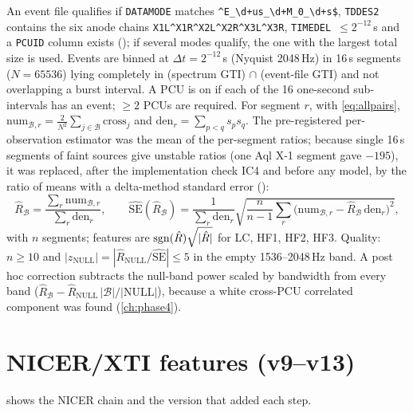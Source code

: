 An event file qualifies if \texttt{DATAMODE} matches \texttt{\^{}E\_\textbackslash d+us\_\textbackslash d+M\_0\_\textbackslash d+s\$},
\texttt{TDDES2} contains the six anode chains \texttt{X1L\^{}X1R\^{}X2L\^{}X2R\^{}X3L\^{}X3R}, \texttt{TIMEDEL}~$\le2^{-12}$\,s and a
\texttt{PCUID} column exists (); if several modes qualify, the one with the largest total size
is used. Events are binned at $\Delta t=2^{-12}$\,s (Nyquist 2048\,Hz) in 16\,s segments ($N=65536$) lying completely in
(spectrum GTI) $\cap$ (event-file GTI) and not overlapping a burst interval. A PCU is on if each of the 16 one-second
sub-intervals has an event; $\ge2$ PCUs are required. For segment $r$, with \cref{eq:allpairs},
$\mathrm{num}_{\mathcal B,r} = \frac{2}{N^2}\sum_{j\in\mathcal B}\mathrm{cross}_j$ and
$\mathrm{den}_r=\sum_{p<q}s_ps_q$. The pre-registered per-observation estimator was the mean of the per-segment ratios;
because single 16\,s segments of faint sources give unstable ratios (one Aql X-1 segment gave $-195$), it was replaced,
after the implementation check IC4 and before any model, by the ratio of means with a delta-method standard error
():
\begin{equation}
\hat R_\mathcal{B} = \frac{\sum_r \mathrm{num}_{\mathcal B,r}}{\sum_r \mathrm{den}_r},\qquad
\widehat{\mathrm{SE}}(\hat R_\mathcal{B}) = \frac{1}{\sum_r\mathrm{den}_r}\sqrt{\frac{n}{n-1}\sum_r\bigl(\mathrm{num}_{\mathcal B,r}-\hat R_\mathcal{B}\,\mathrm{den}_r\bigr)^2},\label{eq:ratioofmeans}
\end{equation}
with $n$ segments; features are $\operatorname{sgn}(\hat R)\sqrt{|\hat R|}$ for LC, HF1, HF2, HF3. Quality: $n\ge10$ and
$|z_\mathrm{NULL}|=|\hat R_\mathrm{NULL}/\widehat{\mathrm{SE}}|\le5$ in the empty 1536--2048\,Hz band. A post hoc
correction subtracts the null-band power scaled by bandwidth from every band
($\hat R_\mathcal{B}-\hat R_\mathrm{NULL}\,|\mathcal B|/|\mathrm{NULL}|$), because a white cross-PCU correlated component
was found (\cref{ch:phase4}).

\section{NICER/XTI features (v9--v13)}\label{sec:nicer}

 shows the NICER chain and the version that added each step.

